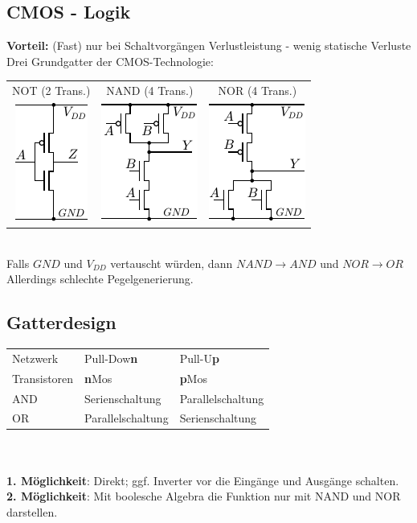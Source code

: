 \documentclass[6pt,a4paper]{scrartcl}
\renewcommand{\emph}[1]{\textsf{\textbf{#1}}}
\newcommand{\ra}[0]{\ensuremath{\rightarrow}} 									%
\begin{document}
\begin{multicols*}{3}
\section{CMOS - Logik}
	\emph{Vorteil:}	 (Fast) nur bei Schaltvorgängen Verlustleistung - wenig statische Verluste \\
Drei Grundgatter der CMOS-Technologie:\\
	\begin{tabular}{ccc}
		NOT (2 Trans.) & NAND (4 Trans.) & NOR (4 Trans.)\\
		\includegraphics{./img/ds/mosfet_not.pdf} \qquad & \includegraphics{./img/ds/mosfet_nand.pdf} \qquad & \includegraphics{./img/ds/mosfet_nor.pdf} \\
	\end{tabular}\\
	Falls $GND$ und $V_{DD}$ vertauscht würden, dann $NAND \ra AND$ und $NOR \ra OR$\\
	Allerdings schlechte Pegelgenerierung.

	\subsection{Gatterdesign}
	\begin{tabular}{l|l|l}
		Netzwerk & Pull-Dow\bf{n} & Pull-U\bf{p} \\
		Transistoren & \textbf{n}Mos & \textbf{p}Mos \\ \hline
		AND & Serienschaltung	 & Parallelschaltung \\
		OR & Parallelschaltung & Serienschaltung \\
	\end{tabular}\\ \\
	\textbf{1. Möglichkeit}: Direkt; ggf. Inverter vor die Eingänge und Ausgänge schalten.\\
	\textbf{2. Möglichkeit}: Mit boolesche Algebra die Funktion nur mit NAND und NOR darstellen.

\end{multicols*}
\end{document}
